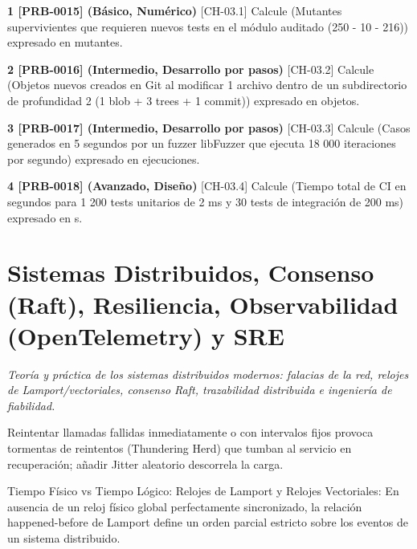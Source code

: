 \documentclass{book}
\begin{document}
\begin{tcolorbox}[title={Ejercicios}, studiumworked, breakable]

\noindent\textbf{1 [PRB-0015] (Básico, Numérico)}
[CH-03.1] Calcule (Mutantes supervivientes que requieren nuevos tests en el módulo auditado (250 - 10 - 216)) expresado en mutantes.

\noindent\textbf{2 [PRB-0016] (Intermedio, Desarrollo por pasos)}
[CH-03.2] Calcule (Objetos nuevos creados en Git al modificar 1 archivo dentro de un subdirectorio de profundidad 2 (1 blob + 3 trees + 1 commit)) expresado en objetos.

\noindent\textbf{3 [PRB-0017] (Intermedio, Desarrollo por pasos)}
[CH-03.3] Calcule (Casos generados en 5 segundos por un fuzzer libFuzzer que ejecuta 18 000 iteraciones por segundo) expresado en ejecuciones.

\noindent\textbf{4 [PRB-0018] (Avanzado, Diseño)}
[CH-03.4] Calcule (Tiempo total de CI en segundos para 1 200 tests unitarios de 2 ms y 30 tests de integración de 200 ms) expresado en s.
\end{tcolorbox}

\chapter{Sistemas Distribuidos, Consenso (Raft), Resiliencia, Observabilidad (OpenTelemetry) y SRE}
\label{chap:ch-04}

\noindent\textit{Teoría y práctica de los sistemas distribuidos modernos: falacias de la red, relojes de Lamport/vectoriales, consenso Raft, trazabilidad distribuida e ingeniería de fiabilidad.}

\begin{tcolorbox}[title={Consejo}, studiumtip, breakable]

Reintentar llamadas fallidas inmediatamente o con intervalos fijos provoca tormentas de reintentos (Thundering Herd) que tumban al servicio en recuperación; añadir Jitter aleatorio descorrela la carga.
\end{tcolorbox}

\begin{tcolorbox}[title={Definición}, studiumdef, breakable]

Tiempo Físico vs Tiempo Lógico: Relojes de Lamport y Relojes Vectoriales: En ausencia de un reloj físico global perfectamente sincronizado, la relación happened-before de Lamport define un orden parcial estricto sobre los eventos de un sistema distribuido.
\end{tcolorbox}
\end{document}
